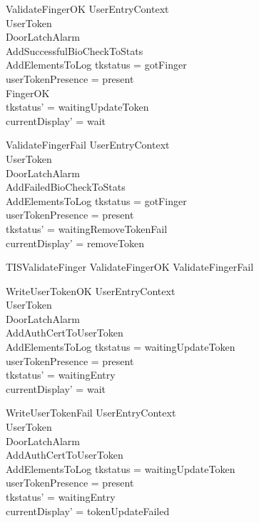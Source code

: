 \begin{schema}{ValidateFingerOK}
  UserEntryContext\\
  \Xi UserToken\\
  \Xi DoorLatchAlarm\\
  AddSuccessfulBioCheckToStats\\
  AddElementsToLog
\where
  tkstatus = gotFinger\\
  userTokenPresence = present\\
  FingerOK\\
  tkstatus' = waitingUpdateToken\\
  currentDisplay' = wait
\end{schema}

\begin{schema}{ValidateFingerFail}
  UserEntryContext\\
  \Xi UserToken\\
  \Xi DoorLatchAlarm\\
  AddFailedBioCheckToStats\\
  AddElementsToLog
\where
  tkstatus = gotFinger\\
  userTokenPresence = present\\
  tkstatus' = waitingRemoveTokenFail\\
  currentDisplay' = removeToken
\end{schema}

\begin{zed}
TISValidateFinger  ValidateFingerOK \lor  ValidateFingerFail \lor  [UserTokenTorn | tkstatus = gotFinger]
\end{zed}

\begin{schema}{WriteUserTokenOK}
  UserEntryContext\\
  \Xi UserToken\\
  \Xi DoorLatchAlarm\\
  AddAuthCertToUserToken\\
  AddElementsToLog
\where
  tkstatus = waitingUpdateToken\\
  userTokenPresence = present\\
  tkstatus' = waitingEntry\\
  currentDisplay' = wait
\end{schema}

\begin{schema}{WriteUserTokenFail}
  UserEntryContext\\
  \Xi UserToken\\
  \Xi DoorLatchAlarm\\
  AddAuthCertToUserToken\\
  AddElementsToLog
\where
  tkstatus = waitingUpdateToken\\
  userTokenPresence = present\\
  tkstatus' = waitingEntry\\
  currentDisplay' = tokenUpdateFailed
\end{schema}

